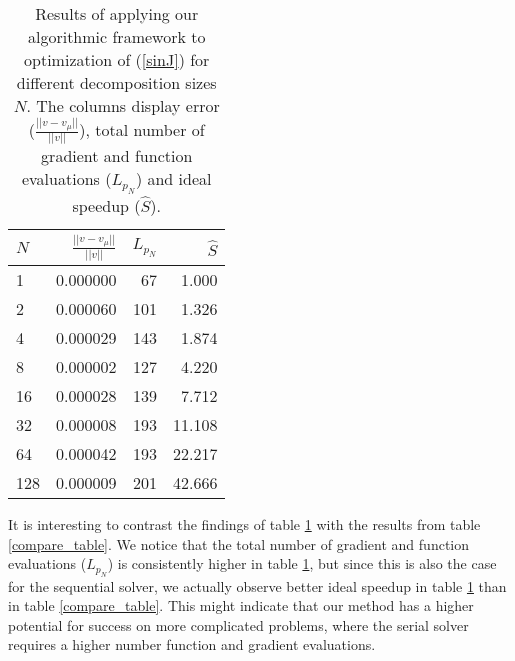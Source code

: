 \begin{table}
\caption{Results of applying our algorithmic framework to optimization of (\ref{sinJ}) for different decomposition sizes $N$. The columns display error ($\frac{||v-v_{\mu}||}{||v||}$), total number of gradient and function evaluations ($L_{p_N}$) and ideal speedup ($\hat S$).}
\centering
\label{unsmoothTab}
\begin{tabular}{lrrr}
\toprule
{} $N$&   $\frac{||v-v_{\mu}||}{||v||}$ &  $L_{p_N}$ &     $\hat S$ \\
\midrule
1   &  0.000000 &   67 &   1.000 \\
2   &  0.000060 &  101 &   1.326 \\
4   &  0.000029 &  143 &   1.874 \\
8   &  0.000002 &  127 &   4.220 \\
16  &  0.000028 &  139 &   7.712 \\
32  &  0.000008 &  193 &  11.108 \\
64  &  0.000042 &  193 &  22.217 \\
128 &  0.000009 &  201 &  42.666 \\
\bottomrule
\end{tabular}
\end{table}
It is interesting to contrast the findings of table \ref{unsmoothTab} with the results from table \ref{compare_table}. We notice that the total number of gradient and function evaluations ($L_{p_N}$) is consistently higher in table \ref{unsmoothTab}, but since this is also the case for the sequential solver, we actually observe better ideal speedup in table \ref{unsmoothTab} than in table \ref{compare_table}. This might indicate that our method has a higher potential for success on more complicated problems, where the serial solver requires a higher number function and gradient evaluations.